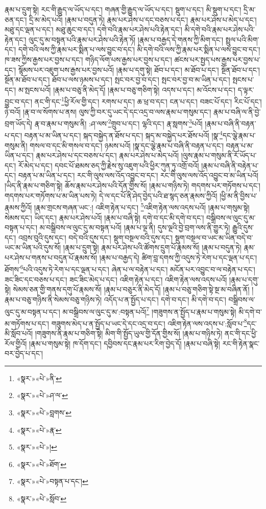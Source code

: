 རྣམ་པ་དྲུག་སྟེ། རང་གི་རྒྱུད་ལ་ཡོད་པ་དང་། གཞན་གྱི་རྒྱུད་ལ་ཡོད་པ་དང་། སྡུག་པ་དང་། མི་སྡུག་པ་དང་། དྲི་མ་ཅན་དང་། དྲི་མ་མེད་པའོ། །རྣམ་པ་བདུན་ཏེ། རྣམ་པར་ཤེས་པ་དང་བཅས་པ་དང་། རྣམ་པར་ཤེས་པ་མེད་པ་དང་། མཐུ་དང་ལྡན་པ་དང་། མཐུ་ཆུང་བ་དང་། དགེ་བའི་རྣམ་པར་ཤེས་པའི་རྟེན་དང་། མི་དགེ་བའི་རྣམ་པར་ཤེས་པའི་རྟེན་དང་། ལུང་དུ་མ་བསྟན་པའི་རྣམ་པར་ཤེས་པའི་རྟེན་ཏོ། །རྣམ་པ་བརྒྱད་དེ་གནས་ཀྱི་མིག་དང་། སྤྲུལ་པའི་མིག་དང་། དགེ་བའི་ལས་ཀྱི་རྣམ་པར་སྨིན་པ་ལས་བྱུང་བ་དང་། མི་དགེ་བའི་ལས་ཀྱི་རྣམ་པར་སྨིན་པ་ལས་བྱུང་བ་དང་། ཁ་ཟས་ཀྱིས་རྒྱས་པར་བྱས་པ་དང་། གཉིད་ལོག་པས་རྒྱས་པར་བྱས་པ་དང་། ཚངས་པར་སྤྱད་པས་རྒྱས་པར་བྱས་པ་དང་། སྙོམས་པར་འཇུག་པས་རྒྱས་པར་བྱས་པའོ། །རྣམ་པ་དགུ་སྟེ། ཐོབ་པ་དང་། མ་ཐོབ་པ་དང་། སྔོན་ཐོབ་པ་དང་། སྔོན་མ་ཐོབ་པ་དང་། ཐོབ་པ་ལས་ཉམས་པ་དང་། སྤང་བར་བྱ་བ་དང་། སྤང་བར་བྱ་བ་མ་ཡིན་པ་དང་། སྤངས་པ་དང་། མ་སྤངས་པའོ། །རྣམ་པ་བཅུ་ནི་མེད་དོ། །རྣམ་པ་བཅུ་གཅིག་སྟེ། འདས་པ་དང་། མ་འོངས་པ་དང་། ད་ལྟར་བྱུང་བ་དང་། ནང་གི་དང་\footnote{«སྣར་»«པེ་»ནི་}ཕྱི་རོལ་གྱི་དང་། རགས་པ་དང་། ཆ་ཕྲ་བ་དང་། ངན་པ་དང་། བཟང་པོ་དང་། རིང་པོ་དང་། ཉེ་བའོ། །རྣ་བ་ལ་སོགས་པ་ནས། ལུས་ཀྱི་བར་དུ་ཡང་དེ་དང་འདྲ་བ་ལས་རྣམ་པ་གསུམ་དང་། རྣམ་པ་བཞི་ལ་ནི་བྱེ་བྲག་ཡོད་དེ། རྣ་བ་རྣམ་པ་གསུམ་ནི། :ཤ་ལས་\footnote{«སྣར་»«པེ་»ཤ་ལ་}གྲུབ་པ་དང་། ལྷའི་དང་། རྣ་སླགས་\footnote{«སྣར་»«པེ་»བླགས་}པའོ། །རྣམ་པ་བཞི་ནི་བརྟན་པ་དང་། བརྟན་པ་མ་ཡིན་པ་དང་། སྐད་བསྐྱེད་ན་ཐོས་པ་དང་། སྐད་མ་བསྐྱེད་པར་ཐོས་པའོ། །སྣ་\footnote{«སྣར་»«པེ་»རྣ་}དང་ལྕེ་རྣམ་པ་གསུམ་ནི། གསལ་བ་དང་མི་གསལ་བ་དང་། ཉམས་པའོ། །སྣ་དང་ལྕེ་རྣམ་པ་བཞི་ནི་བརྟན་པ་དང་། བརྟན་པ་མ་ཡིན་པ་དང་། རྣམ་པར་ཤེས་པ་དང་བཅས་པ་དང་། རྣམ་པར་ཤེས་པ་མེད་པའོ། །ལུས་རྣམ་པ་གསུམ་ནི་རོ་ཡོད་པ་དང་། རོ་མེད་པ་དང་། དབང་པོ་ཐམས་ཅད་ཀྱི་རྗེས་སུ་འཇུག་པའི་ཕྱིར་ཀུན་ཏུ་འགྲོ་བའོ། །རྣམ་པ་བཞི་ནི་བརྟེན་པ་དང་། བརྟན་པ་མ་ཡིན་པ་དང་། རང་གི་ལུས་ལས་འོད་འབྱུང་བ་དང་། རང་གི་ལུས་ལས་འོད་འབྱུང་བ་མ་ཡིན་པའོ། །ཡིད་ནི་རྣམ་པ་གཅིག་སྟེ། ཆོས་རྣམ་པར་ཤེས་པའི་དོན་གྱིས་སོ། །རྣམ་པ་གཉིས་ཏེ། གདགས་པར་གཏོགས་པ་དང་། གདགས་པར་གཏོགས་པ་མ་ཡིན་པས་ཏེ། དེ་ལ་དང་པོ་ནི་ཤེད་བྱེད་པའི་ཐ་སྙད་ཅན་རྣམས་ཀྱིའོ། །ཕྱི་མ་ནི་བྱིས་པ་རྣམས་ཀྱིའོ། །རྣམ་གྲངས་གཞན་ཡང་:། འཇིག་རྟེན་པ་དང་། \footnote{«སྣར་»«པེ་»།  }འཇིག་རྟེན་ལས་འདས་པའོ། །རྣམ་པ་གསུམ་སྟེ། སེམས་དང་། ཡིད་དང་། རྣམ་པར་ཤེས་པའོ། །རྣམ་པ་བཞི་སྟེ། དགེ་བ་དང་མི་དགེ་བ་དང་། བསྒྲིབས་ལ་ལུང་དུ་མ་བསྟན་པ་དང་། མ་བསྒྲིབས་ལ་ལུང་དུ་མ་བསྟན་པའོ། །རྣམ་པ་ལྔ་ནི། དུས་ལྔའི་བྱེ་བྲག་ལས་ནི་གྱུར་ཏེ། རྒྱུའི་དུས་དང་། འབྲས་བུའི་དུས་དང་། བདེ་བའི་དུས་དང་། སྡུག་བསྔལ་བའི་དུས་དང་། སྡུག་བསྔལ་བ་ཡང་མ་ཡིན་བདེ་བ་ཡང་མ་ཡིན་པའི་དུས་སོ། །རྣམ་པ་དྲུག་སྟེ། རྣམ་པར་ཤེས་པའི་ཚོགས་དྲུག་པོ་རྣམས་སོ། །རྣམ་པ་བདུན་ཏེ། རྣམ་པར་ཤེས་པ་གནས་པ་བདུན་པོ་རྣམས་སོ། །རྣམ་པ་བརྒྱད་དེ། ཚིག་བླ་དགས་ཀྱི་འདུས་ཏེ་རེག་པ་དང་ལྡན་པ་དང་། ཐོགས་\footnote{«སྣར་»«པེ་»ཐོག་}པའི་འདུས་ཏེ་རེག་པ་དང་ལྡན་པ་དང་། ཞེན་པ་ལ་བརྟེན་པ་དང་། མངོན་པར་འབྱུང་བ་ལ་བརྟེན་པ་དང་། ཟང་ཟིང་དང་བཅས་པ་དང་། ཟང་ཟིང་མེད་པ་དང་། འཇིག་རྟེན་པ་དང་། འཇིག་རྟེན་ལས་འདས་པའོ། །རྣམ་པ་དགུ་སྟེ། སེམས་ཅན་གྱི་གནས་དགུ་པོ་རྣམས་སོ། །རྣམ་པ་བཅུར་ནི་མེད་དོ། །རྣམ་པ་བཅུ་གཅིག་སྟེ་སྔ་མ་བཞིན་ནོ། །རྣམ་པ་བཅུ་གཉིས་ནི་སེམས་བཅུ་གཉིས་ཏེ། འདོད་པ་ན་སྤྱོད་པ་དང་། དགེ་བ་དང་། མི་དགེ་བ་དང་། བསྒྲིབས་ལ་ལུང་དུ་མ་བསྟན་པ་དང་། མ་བསྒྲིབས་ལ་ལུང་དུ་མ་:བསྟན་པའོ།\footnote{«སྣར་»«པེ་»བསྟན་པ་དང་།} །གཟུགས་ན་སྤྱོད་པ་རྣམ་པ་གསུམ་སྟེ། མི་དགེ་བ་མ་གཏོགས་པ་དང་། གཟུགས་མེད་པ་ན་སྤྱོད་པ་ཡང་དེ་དང་འདྲ་བ་དང་། འཇིག་རྟེན་ལས་འདས་པ་:སློབ་པ་\footnote{«སྣར་»«པེ་»སློབ་}དང་མི་སློབ་པའོ། །གཟུགས་ནི་རྣམ་པ་གཅིག་སྟེ། མིག་གི་སྤྱོད་ཡུལ་གྱི་དོན་གྱིས་སོ། །རྣམ་པ་གཉིས་ཏེ། ནང་གི་དང་ཕྱི་རོལ་གྱིའོ། །རྣམ་པ་གསུམ་སྟེ། ཁ་དོག་དང་། དབྱིབས་དང་རྣམ་པར་རིག་བྱེད་དོ། །རྣམ་པ་བཞི་སྟེ། རང་གི་རྟེན་སྣང་བར་བྱེད་པ་དང་། 
